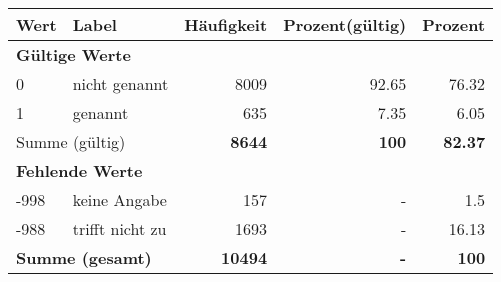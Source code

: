      \begin{longtable}{lXrrr}
     \toprule
     \textbf{Wert} & \textbf{Label} & \textbf{Häufigkeit} & \textbf{Prozent(gültig)} & \textbf{Prozent} \\
     \endhead
     \midrule
     \multicolumn{5}{l}{\textbf{Gültige Werte}}\\

     0 &
     \multicolumn{1}{X}{ nicht genannt   } &


       \num{8009} &
       \num[round-mode=places,round-precision=2]{92,65} &
         \num[round-mode=places,round-precision=2]{76,32} \\

     1 &
     \multicolumn{1}{X}{ genannt   } &


       \num{635} &
       \num[round-mode=places,round-precision=2]{7,35} &
         \num[round-mode=places,round-precision=2]{6,05} \\
     \midrule
     \multicolumn{2}{l}{Summe (gültig)} &
       \textbf{\num{8644}} &
     \textbf{100} &
       \textbf{\num[round-mode=places,round-precision=2]{82,37}} \\
     \multicolumn{5}{l}{\textbf{Fehlende Werte}}\\
       -998 &
       keine Angabe &
         \num{157} &
        - &
         \num[round-mode=places,round-precision=2]{1,5} \\
       -988 &
       trifft nicht zu &
         \num{1693} &
        - &
         \num[round-mode=places,round-precision=2]{16,13} \\
     \midrule
     \multicolumn{2}{l}{\textbf{Summe (gesamt)}} &
          \textbf{\num{10494}} &
        \textbf{-} &
        \textbf{100} \\
     \bottomrule
     \end{longtable}
     

